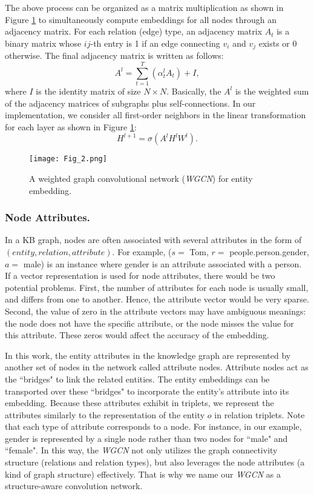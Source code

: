 \documentclass[letterpaper]{article} \usepackage{aaai19}  \usepackage{times}  \usepackage{helvet}  \usepackage{courier}  \usepackage{url}  \usepackage{graphicx}  \usepackage{amsmath}
\begin{document}
The above process can be organized as a matrix multiplication as shown in Figure \ref{fig:wgcn-mat} to simultaneously compute embeddings for all nodes through an adjacency matrix. For each relation (edge) type, an adjacency matrix  $A_t$ is a binary matrix whose $ij$-th entry is 1 if an edge connecting $v_i$ and $v_j$ exists or 0 otherwise. The final adjacency matrix is written as follows: 
\begin{equation} 
A^l = \sum^{T}_{t=1} ( \alpha_t^l A_{t} ) + I ,
\end{equation}
where $I$ is the identity matrix of size $N \times N$. Basically, the $A^l$ is the weighted sum of the adjacency matrices of subgraphs plus self-connections. In our implementation, we consider all first-order neighbors in the linear transformation for each layer as shown in Figure \ref{fig:wgcn-mat}:
\begin{equation} \label{conv_layer}
H^{l+1} = \sigma(A^l H^l W^l).
\end{equation}

\begin{figure}
    \texttt{[image: Fig\_2.png]}
    \caption{A weighted graph convolutional network ({\it WGCN}) for entity embedding.}
    \medskip
\label{fig:wgcn-mat}
\end{figure}

\subsubsection{Node Attributes.}
In a KB graph, nodes are often associated with several attributes in the form of $(entity, relation, attribute)$. For example, ($s=$ Tom, $r=$ people.person.gender, $a=$ male) is an instance where gender is an attribute associated with a person. If a vector representation is used for node attributes, there would be two potential problems. First, the number of attributes for each node is usually small, and differs from one to another. Hence, the attribute vector would be very sparse. Second, the value of zero in the attribute vectors may have ambiguous meanings: the node does not have the specific attribute, or the node misses the value for this attribute. These zeros would affect the accuracy of the embedding. 

In this work, the entity attributes in the knowledge graph are represented by another set of nodes in the network called attribute nodes. Attribute nodes act as the ``bridges" to link the related entities. The entity embeddings can be transported over these ``bridges" to incorporate the entity's attribute into its embedding. Because these attributes exhibit in triplets, we represent the attributes similarly to the representation of the entity $o$ in relation triplets. Note that each type of attribute corresponds to a node. For instance, in our example, gender is represented by a single node rather than two nodes for ``male" and ``female".
In this way, the {\it WGCN} not only utilizes the graph connectivity structure (relations and relation types), but also leverages the node attributes (a kind of graph structure) effectively. That is why we name our {\it WGCN} as a structure-aware convolution network.
\end{document}
